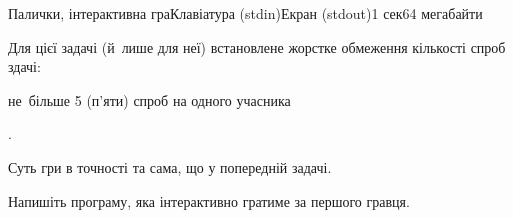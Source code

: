 \begin{problem}{Палички, інтерактивна гра}{Клавіатура (stdin)}{Екран (stdout)}{1 сек}{64 мегабайти}
\label{prob:201819-2-E-sticks-with-spec-moves-interactive}


\ifStatementOnly
Для цієї задачі (й~лише для неї) встановлене жорстке обмеження кількості спроб здачі: \begin{itshape}\begin{bfseries}не~більше 5 (п'яти) спроб на одного учасника\end{bfseries}\end{itshape}.
\fi


Суть гри в точності та сама, що у попередній задачі.

Напишіть програму, яка інтерактивно гратиме за першого гравця. 


\end{problem}
